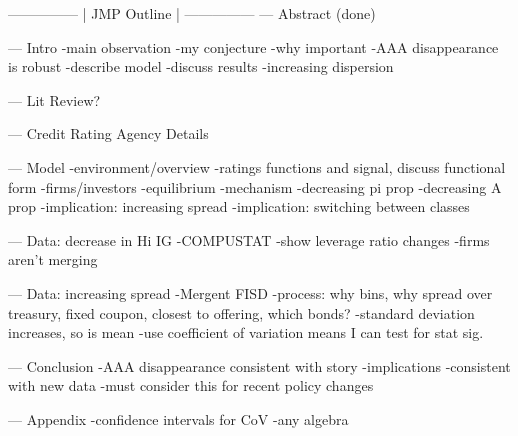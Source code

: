 ---------------
| JMP Outline |
---------------
---
Abstract (done)

---
Intro
-main observation
-my conjecture
-why important
-AAA disappearance is robust
-describe model
-discuss results
-increasing dispersion

---
Lit Review?

---
Credit Rating Agency Details

---
Model
-environment/overview
-ratings functions and signal, discuss functional form
-firms/investors
-equilibrium
-mechanism
-decreasing pi prop
-decreasing A prop
-implication: increasing spread
-implication: switching between classes

---
Data: decrease in Hi IG
-COMPUSTAT
-show leverage ratio changes
-firms aren't merging

---
Data: increasing spread
-Mergent FISD
-process: why bins, why spread over treasury, fixed coupon, closest to offering, which bonds?
-standard deviation increases, so is mean
-use coefficient of variation means I can test for stat sig.

---
Conclusion
-AAA disappearance consistent with story
-implications
-consistent with new data
-must consider this for recent policy changes

---
Appendix
-confidence intervals for CoV
-any algebra